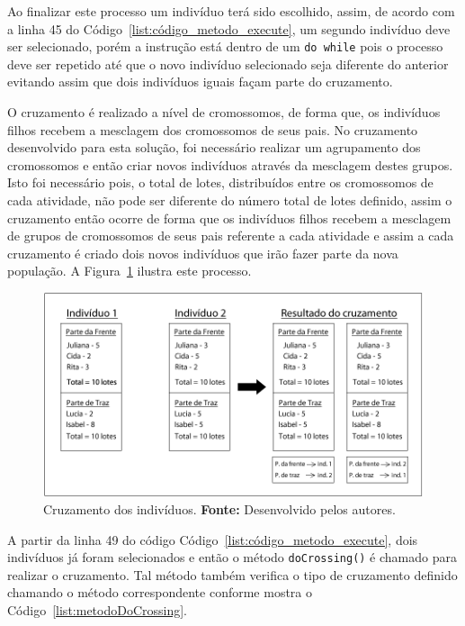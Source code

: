 \par Ao finalizar este processo um indivíduo terá sido escolhido, assim, de acordo com a linha 45 do Código~\ref{list:código_metodo_execute},
um segundo	 indivíduo deve ser selecionado, porém a instrução está dentro de um \texttt{do while} pois o processo deve ser repetido até que 
o novo indivíduo selecionado seja diferente do anterior evitando assim que dois indivíduos iguais façam parte do cruzamento.

\par O cruzamento é realizado a nível de cromossomos, de forma que, os indivíduos filhos recebem 
a mesclagem dos cromossomos de seus pais. No cruzamento desenvolvido para esta solução, foi 
necessário realizar um agrupamento dos cromossomos e então criar novos indivíduos através da
mesclagem destes grupos. Isto foi necessário pois, o total de lotes,
distribuídos entre os cromossomos de cada atividade, não pode ser diferente do número total de lotes definido, assim o 
cruzamento então ocorre de forma que os indivíduos filhos recebem a mesclagem de grupos de 
cromossomos de seus pais referente a cada atividade e assim a cada cruzamento é criado
dois novos indivíduos que irão fazer parte da nova população. A Figura~\ref{fig:ex_cruzamento} ilustra este processo.

\newpage

\begin{figure}[h!]
	\centerline{\includegraphics[scale=0.4]{./imagens/ex_cruzamento.png}}
	\caption[Cruzamento dos indivíduos.]
	{Cruzamento dos indivíduos.
		\textbf{Fonte:} Desenvolvido pelos autores.}
	\label{fig:ex_cruzamento}
\end{figure}


\par A partir da linha 49 do código Código~\ref{list:código_metodo_execute}, dois indivíduos já foram selecionados e então o 
método \texttt{doCrossing()} é chamado para realizar o cruzamento. Tal método também verifica o tipo de cruzamento definido
chamando o método correspondente conforme mostra o Código~\ref{list:metodoDoCrossing}. 



